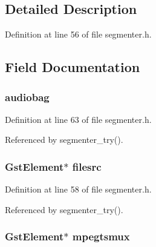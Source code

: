 \subsection{\-Detailed \-Description}


\-Definition at line 56 of file segmenter.\-h.



\subsection{\-Field \-Documentation}
\hypertarget{struct_transcoder_data_a27c753df9dd609802e4649f4be7e64e7}{
\subsubsection[{audiobag}]{ {\bf audiobag}}}\label{struct_transcoder_data_a27c753df9dd609802e4649f4be7e64e7}


\-Definition at line 63 of file segmenter.\-h.



\-Referenced by segmenter\-\_\-try().

\hypertarget{struct_transcoder_data_a650b27f093557fcea9f53f432c7724cf}{
\subsubsection[{filesrc}]{\setlength{\rightskip}{0pt plus 5cm}\-Gst\-Element$\ast$ {\bf filesrc}}}\label{struct_transcoder_data_a650b27f093557fcea9f53f432c7724cf}


\-Definition at line 58 of file segmenter.\-h.



\-Referenced by segmenter\-\_\-try().

\hypertarget{struct_transcoder_data_aa67a91cfc1bc02fc307178ef4f35df14}{
\subsubsection[{mpegtsmux}]{\setlength{\rightskip}{0pt plus 5cm}\-Gst\-Element$\ast$ {\bf mpegtsmux}}}\label{struct_transcoder_data_aa67a91cfc1bc02fc307178ef4f35df14}


